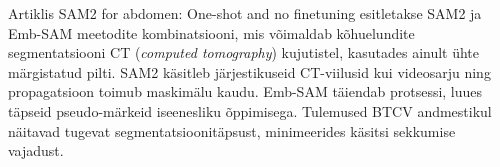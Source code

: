 Artiklis \glqq SAM2 for abdomen: One-shot and no finetuning\grqq{} esitletakse SAM2 ja Emb-SAM
 meetodite kombinatsiooni, mis võimaldab
kõhuelundite segmentatsiooni CT (\textit{computed tomography}) kujutistel, kasutades ainult ühte märgistatud
pilti. SAM2 käsitleb järjestikuseid CT-viilusid kui videosarju ning
propagatsioon toimub maskimälu kaudu. Emb-SAM täiendab protsessi, luues täpseid
pseudo-märkeid iseenesliku õppimisega. Tulemused BTCV andmestikul näitavad
tugevat segmentatsioonitäpsust, minimeerides käsitsi sekkumise vajadust. \cite{hwangSAM2AbdomenOneshot2024}